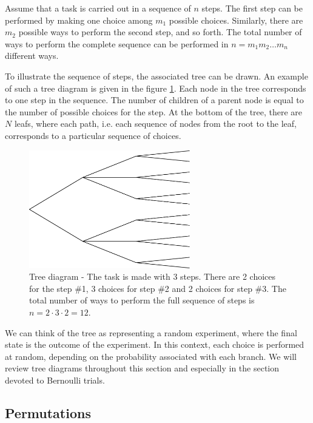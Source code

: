 Assume that a task is carried out in a sequence of $n$ steps. 
The first step can be performed by making one choice among $m_1$ possible choices.
Similarly, there are $m_2$ possible ways to perform the second step, and so forth.
The total number of ways to perform the complete sequence can be performed in
$n=m_1 m_2 \ldots m_n$ different ways.

To illustrate the sequence of steps, the associated tree can be drawn. 
An example of such a tree diagram is given in the figure \ref{fig-introstats-tree-diagram}.
Each node in the tree corresponds to one step in the sequence. 
The number of children of a parent node is equal to the number of 
possible choices for the step. At the bottom of the tree, there are $N$ leafs,
where each path, i.e. each sequence of nodes from the root to the leaf, 
corresponds to a particular sequence of choices. 

\begin{figure}
\begin{center}
\includegraphics[width=7cm]{introdiscreteprobas/tree-diagram.pdf}
\end{center}
\caption{Tree diagram - The task is made with 3 steps. There are 2 choices for the 
step \#1, 3 choices for step \#2 and 2 choices for step \#3. The total number of 
ways to perform the full sequence of steps is $n=2\cdot 3\cdot 2 = 12$.}
\label{fig-introstats-tree-diagram}
\end{figure}

We can think of the tree as representing a random experiment, where 
the final state is the outcome of the experiment. In this context, each 
choice is performed at random, depending on the probability 
associated with each branch. We will review tree diagrams throughout
this section and especially in the section devoted to Bernoulli 
trials.

\subsection{Permutations}

